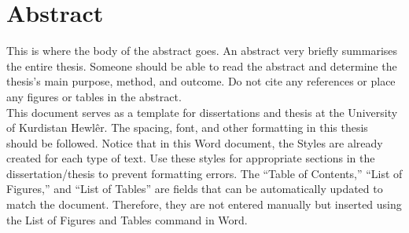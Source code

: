 \chapter*{Abstract}

\begin{justify}
This is where the body of the abstract goes.  An abstract very briefly summarises the entire thesis.  Someone should be able to read the abstract and determine the thesis's main purpose, method, and outcome.  Do not cite any references or place any figures or tables in the abstract. \\

\noindent This document serves as a template for dissertations and thesis at the University of Kurdistan Hewlêr.  The spacing, font, and other formatting in this thesis should be followed.  Notice that in this Word document, the Styles are already created for each type of text.  Use these styles for appropriate sections in the dissertation/thesis to prevent formatting errors.  The “Table of Contents,” “List of Figures,” and “List of Tables” are fields that can be automatically updated to match the document.  Therefore, they are not entered manually but inserted using the List of Figures and Tables command in Word.
\end{justify}

\clearpage
